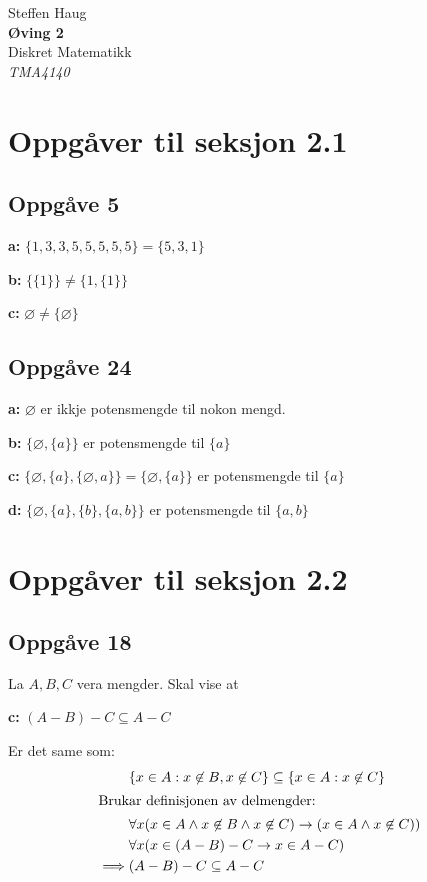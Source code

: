 \documentclass[a4paper, 11pt]{article}
\author{\forfatter}
\date{}
\newcommand{\tittel}{Øving 2}
\newcommand{\fag}{Diskret Matematikk}
\newcommand{\fagkode}{TMA4140}
\newcommand{\forfatter}{Steffen Haug}
\newcommand{\deloppg}[1]{\vspace{1mm}\noindent \textbf{\themecolor{#1:}}}
\newcommand{\themeshade}{Mahogany}
\newcommand{\themecolor}[1]{\textcolor{\themeshade}{#1}}
\newcommand*{\titleTH}{\begingroup %
\raggedleft %
\vspace*{\baselineskip} %

{\Large \forfatter}\\[0.167\textheight] %

{\LARGE\bfseries \tittel}\\[\baselineskip] %

{\themecolor{\Huge \fag}}\\[\baselineskip] %

{\Large \textit{\fagkode}}\par %

\vfill %
\endgroup}
\begin{document}
\pagestyle{empty}
\titleTH\newpage

\section{Oppgåver til seksjon 2.1} %
\subsection*{Oppgåve 5}

\deloppg{a} \( \{ 1,3,3,5,5,5,5,5 \} = \{5,3,1\}\)

\deloppg{b} \( \{\{1\}\} \neq \{1, \{1\}\} \)

\deloppg{c} \( \varnothing \neq \{\varnothing\} \)

\subsection*{Oppgåve 24}
\deloppg{a} \( \varnothing \) er ikkje potensmengde til nokon mengd.

\deloppg{b} \( \{\varnothing, \{a\} \} \) er potensmengde til \( \{a\} \)

\deloppg{c} \( \{ \varnothing, \{a\}, \{\varnothing, a\} \} 
= \{\varnothing,\{a\}\} \) er potensmengde til \(\{a\}\)

\deloppg{d} \( \{\varnothing, \{a\}, \{b\}, \{a,b\}\} \) er potensmengde til \(\{a,b\}\)


\section{Oppgåver til seksjon 2.2}

\subsection{Oppgåve 18}
\noindent La \(A,B,C\) vera mengder. Skal vise at

\deloppg{c} \( (A - B) - C \subseteq A - C \)

\noindent Er det same som:
\begin{align*}
    &\{x \in A : x \not\in B, x \not\in C\} \subseteq \{x \in A : x \not\in C\} \\
    \intertext{Brukar definisjonen av delmengder:}
    &\forall x (x \in A \land x\not\in B \land x\not\in C) \rightarrow (x \in A \land x \not\in C))\\
    &\forall x (x \in (A - B) - C \rightarrow x \in A - C) \\
    \implies &(A - B) - C \subseteq A - C
\end{align*}
\end{document}
